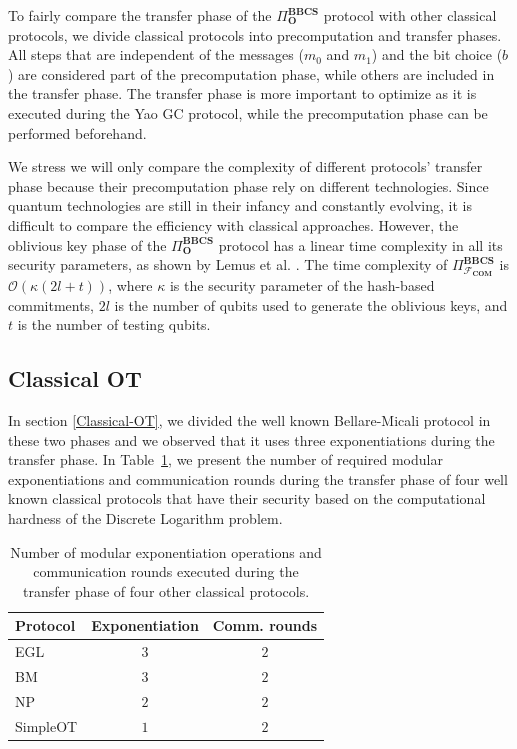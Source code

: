 
To fairly compare the transfer phase of the $\Pi^{\textbf{BBCS}}_{\textbf{O}}$ protocol with other classical protocols, we divide classical protocols into precomputation and transfer phases. All steps that are independent of the messages ($m_0$ and $m_1$) and the bit choice ($b$) are considered part of the precomputation phase, while others are included in the transfer phase. The transfer phase is more important to optimize as it is executed during the Yao GC protocol, while the precomputation phase can be performed beforehand.

We stress we will only compare the complexity of different protocols' transfer phase because their precomputation phase rely on different technologies. Since quantum technologies are still in their infancy and constantly evolving, it is difficult to compare the efficiency with classical approaches. However, the oblivious key phase of the $\Pi^{\textbf{BBCS}}_{\textbf{O}}$ protocol has a linear time complexity in all its security parameters, as shown by Lemus et al. \cite{Lemus20}. The time complexity of $\Pi^{\textbf{BBCS}}_{\mathcal{F}_{\textbf{COM}}}$ is $\mathcal{O}(\kappa(2l + t))$, where $\kappa$ is the security parameter of the hash-based commitments, $2l$ is the number of qubits used to generate the oblivious keys, and $t$ is the number of testing qubits.

\subsection{Classical OT} \label{C-OT_comp}

In section \ref{Classical-OT}, we divided the well known Bellare-Micali protocol in these two phases and we observed that it uses three exponentiations during the transfer phase. In Table~\ref{table:ClassicalOT_comparison}, we present the number of required modular exponentiations and communication rounds during the transfer phase of four well known classical protocols that have their security based on the computational hardness of the Discrete Logarithm problem. 

\begin{table}[h!]
\centering
\begin{tabular}{lcc}
\toprule
Protocol & Exponentiation & Comm. rounds \\
\midrule
EGL \cite{EGL85}      & $3$              & $2$\\ 
BM  \cite{BM89}     & $3$              & $2$ \\ 
NP  \cite{NP01}     & $2$             & $2$  \\ 
SimpleOT \cite{CO15} & $1$              & $2$           \\
\bottomrule
\end{tabular}
\caption{Number of modular exponentiation operations and communication rounds executed during the transfer phase of four other classical protocols.}
\label{table:ClassicalOT_comparison}
\end{table}

